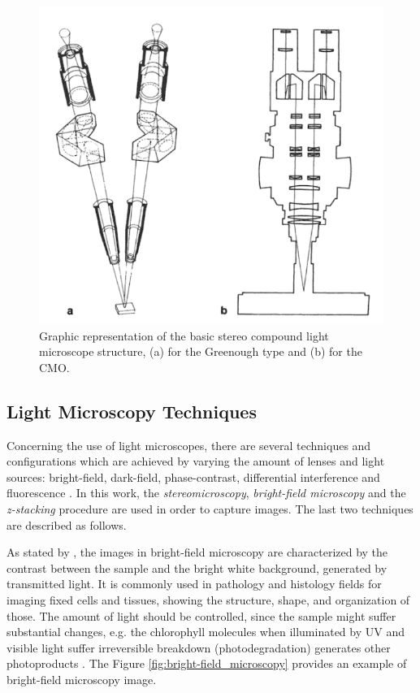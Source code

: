 \begin{figure}[htb]
	\centering
	\caption{\label{fig:stereo_compound_microscope} Graphic representation of the basic stereo compound light microscope structure, (a) for the Greenough type and (b) for the CMO.}
	\begin{center}
	    \includegraphics[scale=0.45]{images/fig6.png}
	\end{center}
	\centering
\end{figure}


\subsection{Light Microscopy Techniques}

Concerning the use of light microscopes, there are several techniques and configurations which are achieved by varying the amount of lenses and light sources: bright-field, dark-field, phase-contrast, differential interference and fluorescence \cite{roane2009microscopic}. In this work, the \emph{stereomicroscopy}, \emph{bright-field microscopy} and the \emph{z-stacking} procedure are used in order to capture images. The last two techniques are described as follows.

As stated by , the images in bright-field microscopy are characterized by the contrast between the sample and the bright white background, generated by transmitted light. It is commonly used in pathology and histology fields for imaging fixed cells and tissues, showing the structure, shape, and organization of those. The amount of light should be controlled, since the sample might suffer substantial changes, e.g. the chlorophyll molecules when illuminated by UV and visible light suffer irreversible breakdown (photodegradation) generates other photoproducts \cite{petrovic2017clorophyll}. The Figure \ref{fig:bright-field_microscopy} provides an example of bright-field microscopy image.

